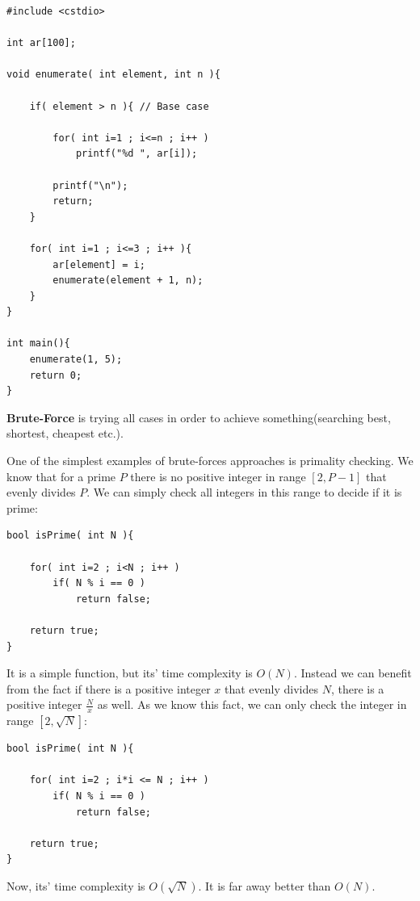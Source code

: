 \documentclass[12pt]{article}
\begin{document}
\begin{verbatim}
#include <cstdio>

int ar[100];

void enumerate( int element, int n ){

    if( element > n ){ // Base case

        for( int i=1 ; i<=n ; i++ )
            printf("%d ", ar[i]);
        
        printf("\n");
        return;
    }

    for( int i=1 ; i<=3 ; i++ ){
        ar[element] = i;
        enumerate(element + 1, n);
    }
}

int main(){
    enumerate(1, 5);
    return 0;
}
\end{verbatim}

\cleardoublepage

\textbf{Brute-Force} is trying all cases in order to achieve something(searching best, shortest, cheapest etc.).

One of the simplest examples of brute-forces approaches is primality checking. We know that for a prime $P$ there is no positive integer in range $[2, P-1]$ that evenly divides $P$. We can simply check all integers in this range to decide if it is prime:

\begin{verbatim}
bool isPrime( int N ){

    for( int i=2 ; i<N ; i++ )
        if( N % i == 0 )
            return false;
    
    return true;
}
\end{verbatim}

It is a simple function, but its' time complexity is $O(N)$. Instead we can benefit from the fact if there is a positive integer $x$ that evenly divides $N$, there is a positive integer $\frac{N}{x}$ as well. As we know this fact, we can only check the integer in range $[2, \sqrt{N}]$:

\begin{verbatim}
bool isPrime( int N ){

    for( int i=2 ; i*i <= N ; i++ )
        if( N % i == 0 )
            return false;
    
    return true;
}
\end{verbatim}

Now, its' time complexity is $O(\sqrt{N})$. It is far away better than $O(N)$.
\cleardoublepage
\end{document}

